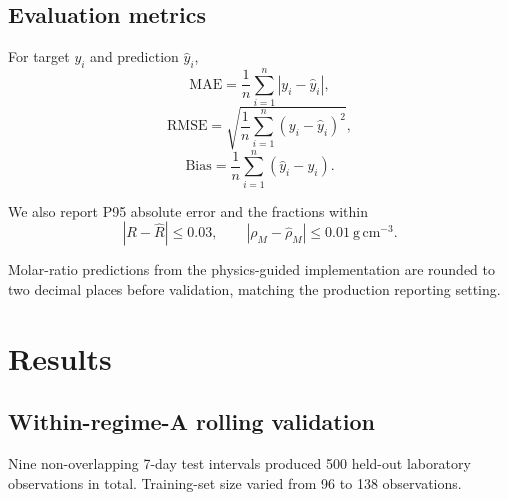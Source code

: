 \documentclass[11pt]{article}
\begin{document}
\subsection{Evaluation metrics}

For target $y_i$ and prediction $\hat y_i$,
\begin{equation}
\mathrm{MAE}=\frac{1}{n}\sum_{i=1}^{n}|y_i-\hat y_i|,
\end{equation}
\begin{equation}
\mathrm{RMSE}=
\sqrt{\frac{1}{n}\sum_{i=1}^{n}(y_i-\hat y_i)^2},
\end{equation}
\begin{equation}
\mathrm{Bias}=
\frac{1}{n}\sum_{i=1}^{n}(\hat y_i-y_i).
\end{equation}

We also report P95 absolute error and the fractions within
\begin{equation}
|R-\widehat R|\le0.03,
\qquad
|\rho_M-\widehat{\rho}_M|\le0.01\ \mathrm{g\,cm^{-3}}.
\end{equation}

Molar-ratio predictions from the physics-guided implementation are rounded to two decimal places before validation, matching the production reporting setting.

\section{Results}

\subsection{Within-regime-A rolling validation}

Nine non-overlapping 7-day test intervals produced 500 held-out laboratory observations in total. Training-set size varied from 96 to 138 observations.

\begin{table}[htbp]
\centering
\caption{Pooled held-out performance across the nine Regime-A test intervals.}
\label{tab:pooledA}
\end{table}
\end{document}
